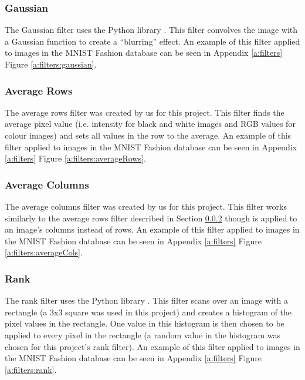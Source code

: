 		\subsubsection{Gaussian} \label{s:filters:descriptions:gaussian}
			The Gaussian filter uses the Python library  \cite{skikitImage}. This filter convolves the image with a Gaussian function to create a ``blurring'' effect. An example of this filter applied to images in the MNIST Fashion database \cite{zalandoresearchFashionMNIST} can be seen in Appendix \ref{a:filters} Figure \ref{a:filters:gaussian}.

		\subsubsection{Average Rows} \label{s:filters:descriptions:averageRows}
			The average rows filter was created by us for this project. This filter finds the average pixel value (i.e. intensity for black and white images and RGB values for colour images) and sets all values in the row to the average. An example of this filter applied to images in the MNIST Fashion database \cite{zalandoresearchFashionMNIST} can be seen in Appendix \ref{a:filters} Figure \ref{a:filters:averageRows}.

		\subsubsection{Average Columns} \label{s:filters:descriptions:averageCols}
			The average columns filter was created by us for this project. This filter works similarly to the average rows filter described in Section \ref{s:filters:descriptions:averageRows} though is applied to an image's columns instead of rows. An example of this filter applied to images in the MNIST Fashion database \cite{zalandoresearchFashionMNIST} can be seen in Appendix \ref{a:filters} Figure \ref{a:filters:averageCols}.

		\subsubsection{Rank} \label{s:filters:descriptions:rank}
			The rank filter uses the Python library  \cite{scipy}. This filter scans over an image with a rectangle (a 3x3 square was used in this project) and creates a histogram of the pixel values in the rectangle. One value in this histogram is then chosen to be applied to every pixel in the rectangle (a random value in the histogram was chosen for this project's rank filter). An example of this filter applied to images in the MNIST Fashion database \cite{zalandoresearchFashionMNIST} can be seen in Appendix \ref{a:filters} Figure \ref{a:filters:rank}.

